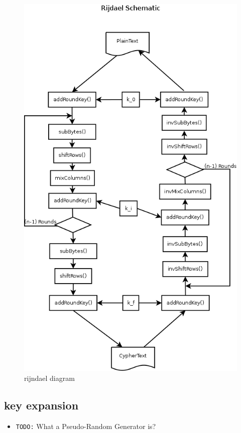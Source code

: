 \documentclass[10pt,a4paper,twoside]{llncs}
\begin{document}
\begin{figure}[h]
 \centering
 \includegraphics[scale=0.3,keepaspectratio=true]{./images/rijndaelDiagram.png}
 \caption{rijndael diagram}
 \label{fig:RijndaelDiagram}
\end{figure}

\subsection{key expansion}\label{sec:keyExpansion}
\begin{itemize}
 \item \texttt{TODO:} What a Pseudo-Random Generator is?
\end{itemize}
\end{document}
